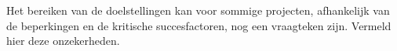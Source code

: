 Het bereiken van de doelstellingen kan voor sommige projecten, afhankelijk van de beperkingen en de kritische succesfactoren, nog een vraagteken zijn. Vermeld hier deze onzekerheden.